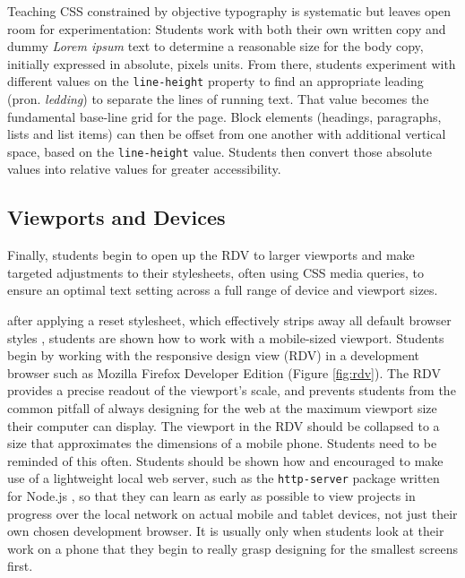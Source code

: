 \documentclass[sigplan,screen]{acmart}
\begin{document}
Teaching CSS constrained by objective typography is systematic but leaves open room for experimentation: Students work with both their own written copy and dummy {\itshape Lorem ipsum} text to determine a reasonable size for the body copy, initially expressed in absolute, pixels units. From there, students experiment with different values on the \verb|line-height| property to find an appropriate leading (pron. {\itshape ledding}) to separate the lines of running text. That value becomes the fundamental base-line grid for the page. Block elements (headings, paragraphs, lists and list items) can then be offset from one another with additional vertical space, based on the \verb|line-height| value. Students then convert those absolute values into relative values for greater accessibility. 

\subsection{Viewports and Devices}


Finally, students begin to open up the RDV to larger viewports and make targeted adjustments to their stylesheets, often using CSS media queries, to ensure an optimal text setting across a full range of device and viewport sizes.





after applying a reset stylesheet, which effectively strips away all default browser styles \cite{em:rc}, students are shown how to work with a mobile-sized viewport. Students begin by working with the responsive design view (RDV) in a development browser such as Mozilla Firefox Developer Edition (Figure \ref{fig:rdv}). The RDV provides a precise readout of the viewport's scale, and prevents students from the common pitfall of always designing for the web at the maximum viewport size their computer can display. The viewport in the RDV should be collapsed to a size that approximates the dimensions of a mobile phone. Students need to be reminded of this often. Students should be shown how and encouraged to make use of a lightweight local web server, such as the \verb|http-server| package written for Node.js \cite{npm:http}, so that they can learn as early as possible to view projects in progress over the local network on actual mobile and tablet devices, not just their own chosen development browser. It is usually only when students look at their work on a phone that they begin to really grasp designing for the smallest screens first.
\end{document}
